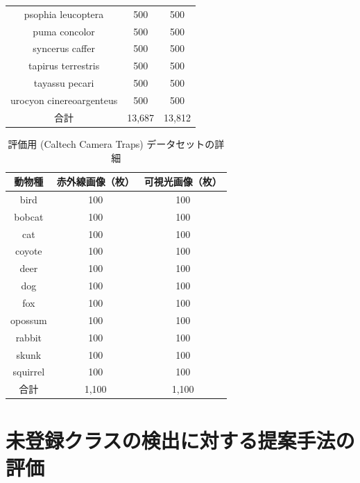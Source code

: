 \begin{table}[tbp]
\begin{tabular}{c|c|c}
      psophia leucoptera       & 500          & 500          \\
      puma concolor            & 500          & 500          \\
      syncerus caffer          & 500          & 500          \\
      tapirus terrestris       & 500          & 500          \\
      tayassu pecari           & 500          & 500          \\
      urocyon cinereoargenteus & 500          & 500          \\ \hline\hline
      合計                      & 13,687       & 13,812       \\ \hline
  \end{tabular}
\end{table}

\begin{table}[tbp]
  \centering
  \caption{評価用 (Caltech Camera Traps) データセットの詳細}
  \label{tbl:cct}
  \begin{tabular}{c|c|c}
      \hline
      動物種       & 赤外線画像（枚） & 可視光画像（枚） \\ \hline\hline
      bird        & 100      & 100       \\
      bobcat      & 100      & 100       \\
      cat         & 100      & 100       \\
      coyote      & 100      & 100       \\
      deer        & 100      & 100       \\
      dog         & 100      & 100       \\
      fox         & 100      & 100       \\
      opossum     & 100      & 100       \\
      rabbit      & 100      & 100       \\
      skunk       & 100      & 100       \\
      squirrel    & 100      & 100       \\ \hline\hline
      合計         & 1,100    & 1,100     \\ \hline
  \end{tabular}
\end{table}

\section{未登録クラスの検出に対する提案手法の評価}
\label{sec:detect}


